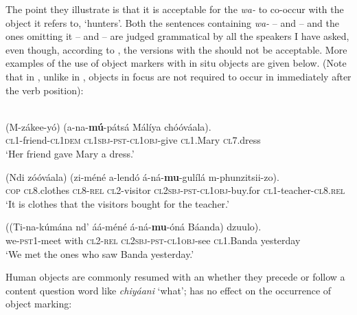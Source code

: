 \documentclass[output=paper]{LSP/langsci}
\begin{document}
The point they illustrate is that it is acceptable for the  \textit{wa-} to co-occur with the object it refers to, ‘hunters’. 
Both the sentences containing \textit{wa-} –  and  – and the ones omitting it –  and  – are judged grammatical by all the speakers I have asked, even though, according to \citet{Bresnanetal1987Topic}, the versions with the  should not be acceptable.
More examples of the use of object markers with in situ objects are given below. 
(Note that in , unlike in , objects in focus are not required to occur in immediately after the verb position):

\ea\label{02-do-ex:13}%
\\ 

\gll (M-zákee-yó) (a-na-\textbf{mú}-pátsá Málíya chóóváala).\\
	\textsc{cl1}-friend-\textsc{cl1dem} \textsc{cl1sbj}-\textsc{pst}-\textsc{cl1obj}-give \textsc{cl1}.Mary \textsc{cl7}.dress\\
\glt ‘Her friend gave Mary a dress.’
\z

\ea\label{02-do-ex:14}%
\ea
\label{02-do-ex:14a}%
\gll (Ndi zóóváala) (zi-méné a-lendó á-ná-\textbf{mu}-gulílá m-phunzitsii-zo).\\ 
	\textsc{cop}	\textsc{cl8}.clothes \textsc{cl8}-\textsc{rel} \textsc{cl2}-visitor \textsc{cl2sbj}-\textsc{pst}-\textsc{cl1obj}-buy.for \textsc{cl1}-teacher-\textsc{cl8}.\textsc{rel}\\
\glt ‘It is clothes that the visitors bought for the teacher.’

\ex
\label{02-do-ex:14b}%
\gll ((Ti-na-kúmána 	nd’ áá-méné á-ná-\textbf{mu}-óná Báanda) dzuulo).\\
	we-\textsc{pst1}-meet with \textsc{cl2}-\textsc{rel} \textsc{cl2sbj}-\textsc{pst}-\textsc{cl1obj}-see	\textsc{cl1}.Banda yesterday\\
\glt ‘We met the ones who saw Banda yesterday.’
\z
\z

Human objects are commonly resumed with an  whether they precede or follow a content question word like \textit{chiyáani} ‘what’;  has no effect on the occurrence of object marking:
\end{document}
